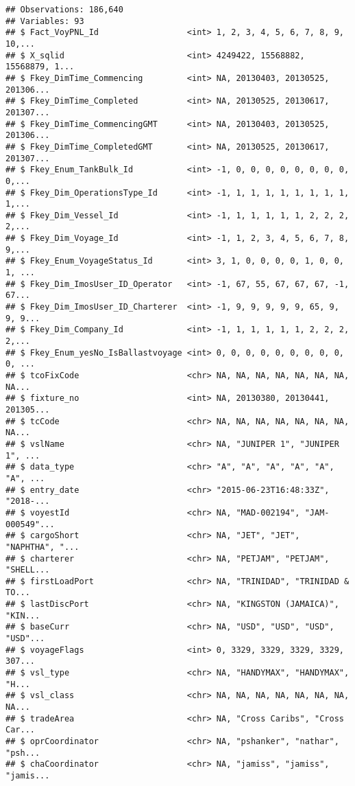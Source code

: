 \documentclass[]{article}
\begin{document}
\begin{verbatim}
## Observations: 186,640
## Variables: 93
## $ Fact_VoyPNL_Id                  <int> 1, 2, 3, 4, 5, 6, 7, 8, 9, 10,...
## $ X_sqlid                         <int> 4249422, 15568882, 15568879, 1...
## $ Fkey_DimTime_Commencing         <int> NA, 20130403, 20130525, 201306...
## $ Fkey_DimTime_Completed          <int> NA, 20130525, 20130617, 201307...
## $ Fkey_DimTime_CommencingGMT      <int> NA, 20130403, 20130525, 201306...
## $ Fkey_DimTime_CompletedGMT       <int> NA, 20130525, 20130617, 201307...
## $ Fkey_Enum_TankBulk_Id           <int> -1, 0, 0, 0, 0, 0, 0, 0, 0, 0,...
## $ Fkey_Dim_OperationsType_Id      <int> -1, 1, 1, 1, 1, 1, 1, 1, 1, 1,...
## $ Fkey_Dim_Vessel_Id              <int> -1, 1, 1, 1, 1, 1, 2, 2, 2, 2,...
## $ Fkey_Dim_Voyage_Id              <int> -1, 1, 2, 3, 4, 5, 6, 7, 8, 9,...
## $ Fkey_Enum_VoyageStatus_Id       <int> 3, 1, 0, 0, 0, 0, 1, 0, 0, 1, ...
## $ Fkey_Dim_ImosUser_ID_Operator   <int> -1, 67, 55, 67, 67, 67, -1, 67...
## $ Fkey_Dim_ImosUser_ID_Charterer  <int> -1, 9, 9, 9, 9, 9, 65, 9, 9, 9...
## $ Fkey_Dim_Company_Id             <int> -1, 1, 1, 1, 1, 1, 2, 2, 2, 2,...
## $ Fkey_Enum_yesNo_IsBallastvoyage <int> 0, 0, 0, 0, 0, 0, 0, 0, 0, 0, ...
## $ tcoFixCode                      <chr> NA, NA, NA, NA, NA, NA, NA, NA...
## $ fixture_no                      <int> NA, 20130380, 20130441, 201305...
## $ tcCode                          <chr> NA, NA, NA, NA, NA, NA, NA, NA...
## $ vslName                         <chr> NA, "JUNIPER 1", "JUNIPER 1", ...
## $ data_type                       <chr> "A", "A", "A", "A", "A", "A", ...
## $ entry_date                      <chr> "2015-06-23T16:48:33Z", "2018-...
## $ voyestId                        <chr> NA, "MAD-002194", "JAM-000549"...
## $ cargoShort                      <chr> NA, "JET", "JET", "NAPHTHA", "...
## $ charterer                       <chr> NA, "PETJAM", "PETJAM", "SHELL...
## $ firstLoadPort                   <chr> NA, "TRINIDAD", "TRINIDAD & TO...
## $ lastDiscPort                    <chr> NA, "KINGSTON (JAMAICA)", "KIN...
## $ baseCurr                        <chr> NA, "USD", "USD", "USD", "USD"...
## $ voyageFlags                     <int> 0, 3329, 3329, 3329, 3329, 307...
## $ vsl_type                        <chr> NA, "HANDYMAX", "HANDYMAX", "H...
## $ vsl_class                       <chr> NA, NA, NA, NA, NA, NA, NA, NA...
## $ tradeArea                       <chr> NA, "Cross Caribs", "Cross Car...
## $ oprCoordinator                  <chr> NA, "pshanker", "nathar", "psh...
## $ chaCoordinator                  <chr> NA, "jamiss", "jamiss", "jamis...

\end{verbatim}
\end{document}
